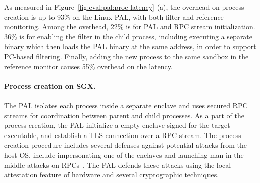 As measured in
Figure~\ref{fig:eval:pal:proc-latency} (a),
the overhead on process creation
is up to 93\% on the Linux PAL,
with both \seccomp{} filter and reference monitoring.
Among the overhead,
22\% is for PAL and RPC stream initialization.
36\% is for enabling the \seccomp{} filter
in the child process,
including executing a separate binary
which then loads the PAL binary at the same address,
in order to
support PC-based filtering.
Finally,
adding the new process to the same sandbox
in the reference monitor
causes 55\% overhead on the latency.










\paragraph{Process creation on SGX.}
The \sgx{} PAL isolates each process inside a separate enclave
and uses secured RPC streams
for coordination between parent and child processes.
As a part of the process creation,
the \sgx{} PAL initialize a empty enclave
signed for the target executable,
and establish a TLS connection over a RPC stream.
The process creation procedure
includes several defenses against potential attacks
from the host OS,
include impersonating one of the enclaves and launching man-in-the-middle attacks on RPCs~\cite{shinde17panoply}.
The \sgx{} PAL defends these attacks
using the local attestation feature of \sgx{} hardware and several cryptographic techniques.



